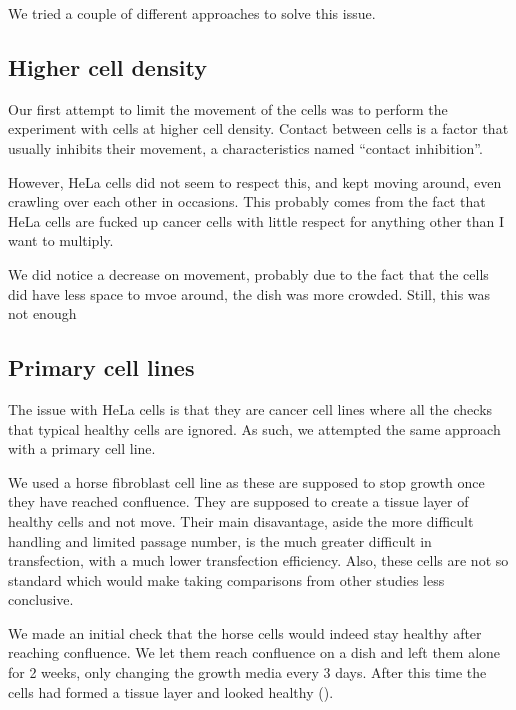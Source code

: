   We tried a couple of different approaches to solve this issue.
  
  \subsection{Higher cell density}
  
    Our first attempt to limit the movement of the cells was to perform the experiment with
    cells at higher cell density.  Contact between cells is a factor that usually inhibits
    their movement, a characteristics named ``contact inhibition''.
    
    However, HeLa cells did not seem to respect this, and kept moving around, even crawling
    over each other in occasions. This probably comes from the fact that HeLa cells are fucked
    up cancer cells with little respect for anything other than I want to multiply.
    
    We did notice a decrease on movement, probably due to the fact that the cells did have less
    space to mvoe around, the dish was more crowded. Still, this was not enough

  \subsection{Primary cell lines}
  
    The issue with HeLa cells is that they are cancer cell lines where all the checks that typical
    healthy cells are ignored. As such, we attempted the same approach with a primary cell line.
    
    We used a horse fibroblast cell line as these are supposed to stop growth once they have reached
    confluence. They are supposed to create a tissue layer of healthy cells and not move. Their main
    disavantage, aside the more difficult handling and limited passage number, is the much greater
    difficult in transfection, with a much lower transfection efficiency. Also, these cells are not
    so standard which would make taking comparisons from other studies less conclusive.
    
    We made an initial check that the horse cells would indeed stay healthy after reaching confluence.
    We let them reach confluence on a dish and left them alone for 2 weeks, only changing the growth
    media every 3 days. After this time the cells had formed a tissue layer and looked healthy ().
    
